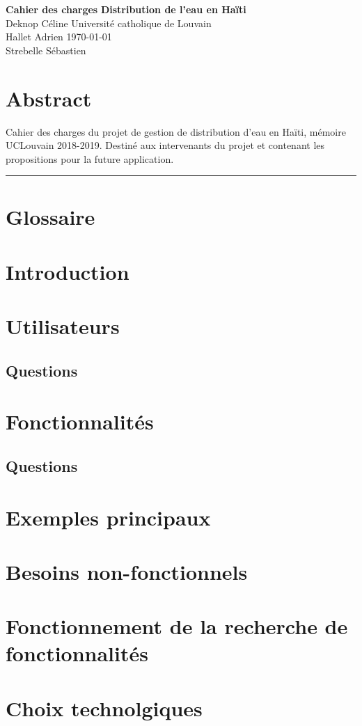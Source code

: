 \documentclass[a4paper, 11pt]{article}
\begin{document}
\noindent
\large\textbf{Cahier des charges} \hfill \textbf{Distribution de l'eau en Haïti} \\
\normalsize Deknop Céline \hfill Université catholique de Louvain \\
Hallet Adrien \hfill \today \\
Strebelle Sébastien

\section*{Abstract}
Cahier des charges du projet de gestion de distribution d'eau en Haïti, mémoire UCLouvain 2018-2019. Destiné aux intervenants du projet et contenant les propositions pour la future application.
\hrule
\section{Glossaire}
\section{Introduction}
\section{Utilisateurs}
  \subsection{Questions}
\section{Fonctionnalités}
  \subsection{Questions}
\section{Exemples principaux}
\section{Besoins non-fonctionnels}
\section{Fonctionnement de la recherche de fonctionnalités}
\section{Choix technolgiques}
\end{document}
